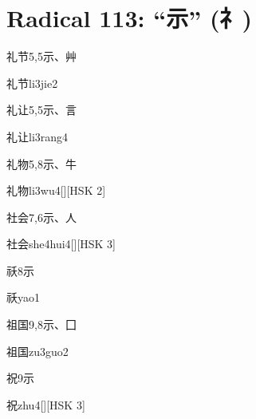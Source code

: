 
\section*{Radical 113: ``⽰'' (礻)}

\begin{entry}{礼节}{5,5}{⽰、⾋}
  \begin{phonetics}{礼节}{li3jie2}
  \end{phonetics}
\end{entry}

\begin{entry}{礼让}{5,5}{⽰、⾔}
  \begin{phonetics}{礼让}{li3rang4}
  \end{phonetics}
\end{entry}

\begin{entry}{礼物}{5,8}{⽰、⽜}
  \begin{phonetics}{礼物}{li3wu4}[][HSK 2]
  \end{phonetics}
\end{entry}

\begin{entry}{社会}{7,6}{⽰、⼈}
  \begin{phonetics}{社会}{she4hui4}[][HSK 3]
  \end{phonetics}
\end{entry}

\begin{entry}{祅}{8}{⽰}
  \begin{phonetics}{祅}{yao1}
  \end{phonetics}
\end{entry}

\begin{entry}{祖国}{9,8}{⽰、⼞}
  \begin{phonetics}{祖国}{zu3guo2}
  \end{phonetics}
\end{entry}

\begin{entry}{祝}{9}{⽰}
  \begin{phonetics}{祝}{zhu4}[][HSK 3]
  \end{phonetics}
\end{entry}

